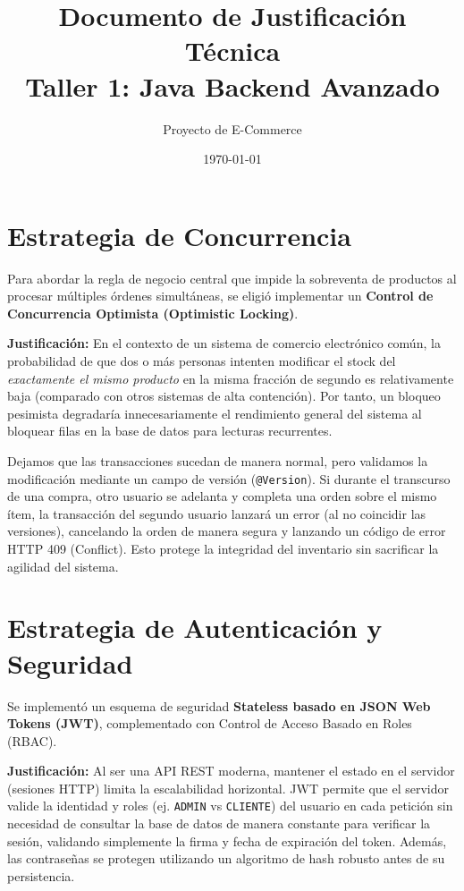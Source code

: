 \documentclass[12pt, a4paper]{article}
\title{Documento de Justificación Técnica \\ \Large Taller 1: Java Backend Avanzado}
\author{Proyecto de E-Commerce}
\date{\today}
\begin{document}
\maketitle

\section{Estrategia de Concurrencia}
Para abordar la regla de negocio central que impide la sobreventa de productos al procesar múltiples órdenes simultáneas, se eligió implementar un \textbf{Control de Concurrencia Optimista (Optimistic Locking)}.

\textbf{Justificación:} En el contexto de un sistema de comercio electrónico común, la probabilidad de que dos o más personas intenten modificar el stock del \textit{exactamente el mismo producto} en la misma fracción de segundo es relativamente baja (comparado con otros sistemas de alta contención). Por tanto, un bloqueo pesimista degradaría innecesariamente el rendimiento general del sistema al bloquear filas en la base de datos para lecturas recurrentes. 

Dejamos que las transacciones sucedan de manera normal, pero validamos la modificación mediante un campo de versión (\texttt{@Version}). Si durante el transcurso de una compra, otro usuario se adelanta y completa una orden sobre el mismo ítem, la transacción del segundo usuario lanzará un error (al no coincidir las versiones), cancelando la orden de manera segura y lanzando un código de error HTTP 409 (Conflict). Esto protege la integridad del inventario sin sacrificar la agilidad del sistema.

\section{Estrategia de Autenticación y Seguridad}
Se implementó un esquema de seguridad \textbf{Stateless basado en JSON Web Tokens (JWT)}, complementado con Control de Acceso Basado en Roles (RBAC).

\textbf{Justificación:} Al ser una API REST moderna, mantener el estado en el servidor (sesiones HTTP) limita la escalabilidad horizontal. JWT permite que el servidor valide la identidad y roles (ej. \texttt{ADMIN} vs \texttt{CLIENTE}) del usuario en cada petición sin necesidad de consultar la base de datos de manera constante para verificar la sesión, validando simplemente la firma y fecha de expiración del token. Además, las contraseñas se protegen utilizando un algoritmo de hash robusto antes de su persistencia.
\end{document}
